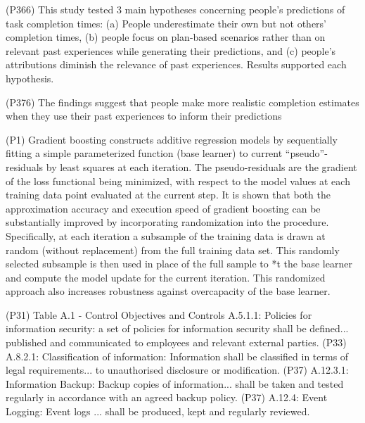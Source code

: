 \documentclass[11pt]{article}
\begin{document}
    \cite{buehler1994exploring} (P366) This study tested 3 main hypotheses concerning people's predictions of task completion times: (a) People underestimate their own but not others' completion times, (b) people focus on plan-based scenarios rather than on relevant past experiences while generating their predictions, and (c) people's attributions diminish the relevance of past experiences. Results supported each hypothesis. 
    
    \cite{buehler1994exploring} (P376) The findings suggest that people make more realistic completion estimates when they use their past experiences to inform their predictions
    
    \cite{friedman2002stochastic} (P1) Gradient boosting constructs additive regression models by sequentially fitting a simple parameterized function (base learner) to current “pseudo”-residuals by least squares at each iteration. The
    pseudo-residuals are the gradient of the loss functional being minimized, with respect to the model
    values at each training data point evaluated at the current step. It is shown that both the approximation
    accuracy and execution speed of gradient boosting can be substantially improved by incorporating randomization into the procedure. Specifically, at each iteration a subsample of the training data is drawn
    at random (without replacement) from the full training data set. This randomly selected subsample is
    then used in place of the full sample to *t the base learner and compute the model update for the
    current iteration. This randomized approach also increases robustness against overcapacity of the base
    learner.
    
    \cite{ISO} (P31) Table A.1 - Control Objectives and Controls
    A.5.1.1: Policies for information security: a set of policies for information security shall be defined... published and communicated to employees and relevant external parties.
    (P33) A.8.2.1: Classification of information: Information shall be classified in terms of legal requirements... to unauthorised disclosure or modification.
    (P37) A.12.3.1: Information Backup: Backup copies of information... shall be taken and tested regularly in accordance with an agreed backup policy.
    (P37) A.12.4: Event Logging: Event logs ... shall be produced, kept and regularly reviewed.


\end{document}
